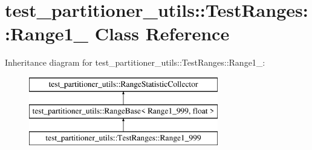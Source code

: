 \hypertarget{classtest__partitioner__utils_1_1TestRanges_1_1Range1__999}{}\section{test\+\_\+partitioner\+\_\+utils\+:\+:Test\+Ranges\+:\+:Range1\+\_ Class Reference}
\label{classtest__partitioner__utils_1_1TestRanges_1_1Range1__999}
Inheritance diagram for test\+\_\+partitioner\+\_\+utils\+:\+:Test\+Ranges\+:\+:Range1\+\_\+:\begin{figure}[H]
\begin{center}
\leavevmode
\includegraphics[height=3.000000cm]{classtest__partitioner__utils_1_1TestRanges_1_1Range1__999}
\end{center}
\end{figure}
